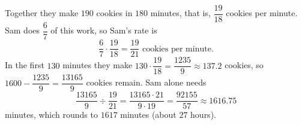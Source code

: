 Together they make $190$ cookies in $180$ minutes, that is, $\dfrac{19}{18}$ cookies per minute. Sam does $\dfrac{6}{7}$ of this work, so Sam's rate is
\[\dfrac{6}{7}\cdot\dfrac{19}{18}=\dfrac{19}{21}\text{ cookies per minute}.\]
In the first $130$ minutes they make $130\cdot\dfrac{19}{18}=\dfrac{1235}{9}\approx137.2$ cookies, so $1600-\dfrac{1235}{9}=\dfrac{13165}{9}$ cookies remain. Sam alone needs
\[\dfrac{13165}{9}\div\dfrac{19}{21}=\dfrac{13165\cdot21}{9\cdot19}=\dfrac{92155}{57}\approx1616.75\]
minutes, which rounds to $\boxed{1617}$ minutes (about $27$ hours).
